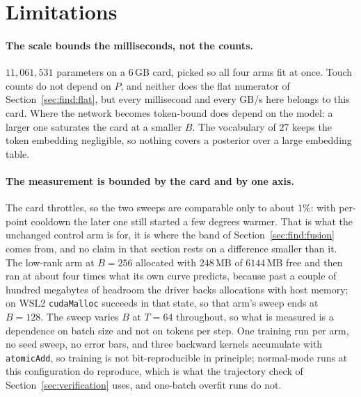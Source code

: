 \section{Limitations}
\label{sec:limitations}


\paragraph{The scale bounds the milliseconds, not the counts.}
$11{,}061{,}531$ parameters on a $6$\,GB card, picked so all four arms fit at once.
Touch counts do not depend on $P$, and neither does the flat numerator of
Section~\ref{sec:find:flat}, but every millisecond and every GB/s here belongs to this
card. Where the network becomes token-bound does depend on the model: a larger one
saturates the card at a smaller $B$. The vocabulary of $27$ keeps the token embedding
negligible, so nothing covers a posterior over a large embedding table.

\paragraph{The measurement is bounded by the card and by one axis.}
The card throttles, so the two sweeps are comparable only to about $1\%$: with
per-point cooldown the later one still started a few degrees warmer. That is what the
unchanged control arm is for, it is where the band of Section~\ref{sec:find:fusion}
comes from, and no claim in that section rests on a difference smaller than it. The
low-rank arm at $B = 256$ allocated with $248$\,MB of $6144$\,MB free and then ran at
about four times what its own curve predicts, because past a couple of hundred
megabytes of headroom the driver backs allocations with host memory; on WSL2
\texttt{cudaMalloc} succeeds in that state, so that arm's sweep ends at $B = 128$. The
sweep varies $B$ at $T = 64$ throughout, so what is measured is a dependence on batch
size and not on tokens per step. One training run per arm, no seed sweep, no error
bars, and three backward kernels accumulate with \texttt{atomicAdd}, so training is
not bit-reproducible in principle; normal-mode runs at this configuration do
reproduce, which is what the trajectory check of Section~\ref{sec:verification} uses,
and one-batch overfit runs do not.

